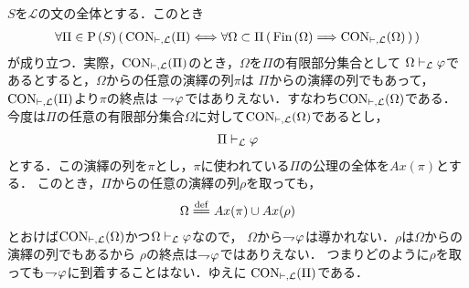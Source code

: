 	\begin{sketch}
		$S$を$\mathcal{L}$の文の全体とする．このとき
		\begin{align}
			\forall \Pi \in \operatorname*{P}\hspace{0.15em}(S)\, 
			(\, \operatorname{CON}_{\vdash,\mathcal{L}}(\Pi) \Longleftrightarrow 
			\forall \Omega \subset \Pi\, (\, \operatorname*{Fin}\hspace{0.15em}(\Omega) \Longrightarrow \operatorname{CON}_{\vdash,\mathcal{L}}(\Omega)\, )\, )
		\end{align}
		が成り立つ．実際，$\operatorname{CON}_{\vdash,\mathcal{L}}(\Pi)$のとき，$\Omega$を$\Pi$の有限部分集合として
		$\Omega \vdash_{{\scriptsize \mathcal{L}}} \varphi$であるとすると，$\Omega$からの任意の演繹の列$\pi$は
		$\Pi$からの演繹の列でもあって，$\operatorname{CON}_{\vdash,\mathcal{L}}(\Pi)$より$\pi$の終点は
		$\rightharpoondown\hspace{-0.25em} \varphi$ではありえない．すなわち$\operatorname{CON}_{\vdash,\mathcal{L}}(\Omega)$である．
		今度は$\Pi$の任意の有限部分集合$\Omega$に対して$\operatorname{CON}_{\vdash,\mathcal{L}}(\Omega)$であるとし，
		\begin{align}
			\Pi \vdash_{{\scriptsize \mathcal{L}}} \varphi
		\end{align}
		とする．この演繹の列を$\pi$とし，$\pi$に使われている$\Pi$の公理の全体を$Ax(\pi)$とする．
		このとき，$\Pi$からの任意の演繹の列$\rho$を取っても，
		\begin{align}
			\Omega \defeq Ax(\pi) \cup Ax(\rho)
		\end{align}
		とおけば$\operatorname{CON}_{\vdash,\mathcal{L}}(\Omega)$かつ$\Omega \vdash_{{\scriptsize \mathcal{L}}} \varphi$なので，
		$\Omega$から$\rightharpoondown\hspace{-0.25em} \varphi$は導かれない．$\rho$は$\Omega$からの演繹の列でもあるから
		$\rho$の終点は$\rightharpoondown\hspace{-0.25em} \varphi$ではありえない．
		つまりどのように$\rho$を取っても$\rightharpoondown\hspace{-0.25em} \varphi$に到着することはない．ゆえに
		$\operatorname{CON}_{\vdash,\mathcal{L}}(\Pi)$である．
	\end{sketch}